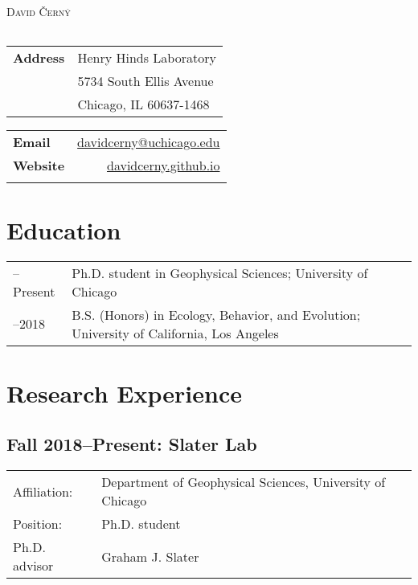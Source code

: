 \documentclass[10pt]{article}
\begin{document}
\frenchspacing

\begin{center}
{\LARGE \textsc{David \v{C}ern\'{y}}}

\begin{tabularx}{\textwidth}{c}
\hline
\end{tabularx}
\end{center}

\begin{center}
\begin{tabular}{ll}
\textbf{Address} & Henry Hinds Laboratory \\
& 5734 South Ellis Avenue \\
& Chicago, IL 60637-1468 \\
\end{tabular}
\hfill
\begin{tabular}{lr}
\textbf{Email} & \href{mailto:davidcerny@uchicago.edu}{davidcerny@uchicago.edu} \\
\textbf{Website} & \href{http://davidcerny.github.io}{davidcerny.github.io} \\
&
\end{tabular}
\end{center}

\section*{Education}

\begin{tabularx}{\textwidth}{>{\raggedleft\arraybackslash}p{2.2cm} l}
2018--Present & Ph.D. student in Geophysical Sciences; University of Chicago \\[0.1cm]
2014--2018 & B.S. (Honors) in Ecology, Behavior, and Evolution; University of California, Los Angeles
\end{tabularx}

\section*{Research Experience}

\subsection*{Fall 2018--Present: Slater Lab}

\begin{tabularx}{\textwidth}{>{\raggedleft\arraybackslash}p{3.6cm} X}
Affiliation: & Department of Geophysical Sciences, University of Chicago \\[0.1cm]
Position: & Ph.D. student \\[0.1cm]
Ph.D. advisor & Graham J. Slater
\end{tabularx}
\end{document}
